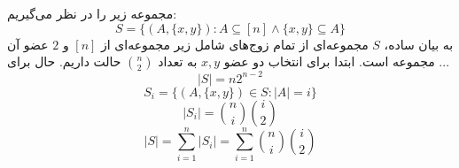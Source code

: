مجموعه زیر را در نظر می‌گیریم:
$$S = \{(A, \{x, y\}) : A  \subseteq [n] \wedge \{x, y\} \subseteq A \}$$
به بیان ساده، 
$S$
مجموعه‌ای از تمام زوج‌های شامل زیر مجموعه‌ای از
$[n]$
و
$2$
عضو آن مجموعه است.
ابتدا برای انتخاب دو عضو
$x, y$
به تعداد
$\binom{n}{2}$
حالت داریم.
حال برای ...
$$|S| = n2^{n-2}$$
$$S_i = \{(A, \{x, y\}) \in S: |A| = i\}$$
$$|S_i| = \binom{n}{i}\binom{i}{2}$$
$$|S| = \sum_{i=1}^{n}|S_i| = \sum_{i=1}^{n}\binom{n}{i} \binom{i}{2}$$